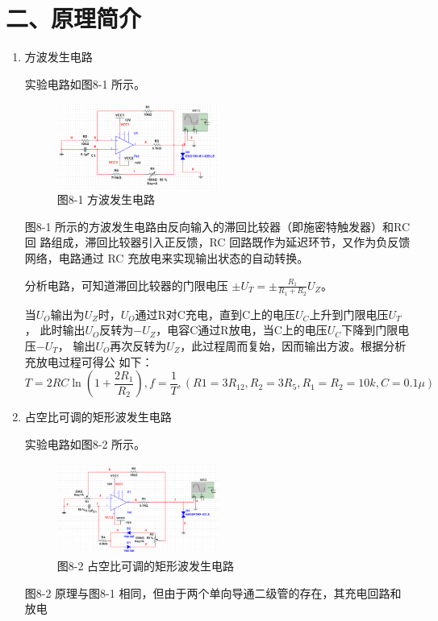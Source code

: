 \documentclass[a4paper,10pt,notitlepage]{article}
\begin{document}
	\section*{二、原理简介}
	\begin{enumerate}
		\item 方波发生电路\par 
		实验电路如图8-1 所示。\par 
		\begin{figure}[h]
			\centering
			\includegraphics[width=0.5\textwidth]{1.png}
			\caption*{图8-1 方波发生电路}
		\end{figure}
		\qquad 图8-1 所示的方波发生电路由反向输入的滞回比较器（即施密特触发器）和RC 回
		路组成，滞回比较器引入正反馈，RC 回路既作为延迟环节，又作为负反馈网络，电路通过
		RC 充放电来实现输出状态的自动转换。\par 
		分析电路，可知道滞回比较器的门限电压 $\pm U_T=\pm \frac{R_1}{R_1+R_2}U_Z$。\par 
		\qquad 当$U_O$输出为$U_Z$时，$U_O$通过R对C充电，直到C上的电压$U_C$上升到门限电压$U_T$，
		此时输出$U_O$反转为$-U_Z$，电容C通过R放电，当C上的电压$U_C$下降到门限电压$-U_T$，
		输出$U_O$再次反转为$U_Z$，此过程周而复始，因而输出方波。根据分析充放电过程可得公
		如下：
		$$T=2RC\ln{(1+\frac{2R_1}{R_2})},f=\frac{1}{T},(R1=3R_{12},R_2=3R_5,R_1=R_2=10k,C=0.1\mu)$$
		\item 占空比可调的矩形波发生电路\par 
		实验电路如图8-2 所示。\par 
		\begin{figure}[h]
			\centering
			\includegraphics[width=0.5\textwidth]{2.png}
			\caption*{图8-2 占空比可调的矩形波发生电路}
		\end{figure}
		\qquad 图8-2 原理与图8-1 相同，但由于两个单向导通二级管的存在，其充电回路和放电

\end{enumerate}
\end{document}
